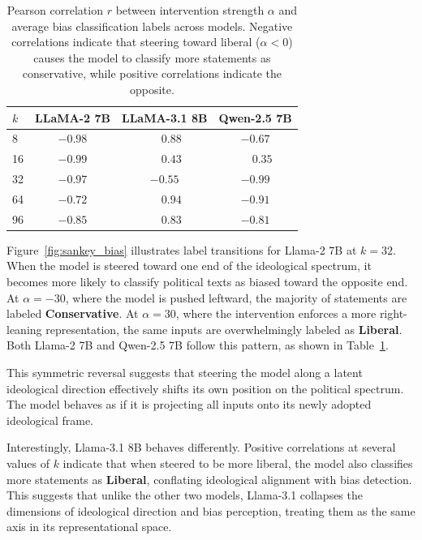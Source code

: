 \documentclass[11pt]{article}
\begin{document}
\begin{table}[t]
    \centering
    \small
    \begin{tabular}{lccc}
        \toprule
        $k$ & LLaMA-2 7B & LLaMA-3.1 8B & Qwen-2.5 7B \\
        \midrule
        8   & $-0.98$ & $\phantom{-}0.88$ & $-0.67$ \\
        16  & $\mathbf{-0.99}$ & $\phantom{-}0.43$ & $\phantom{-}0.35$ \\
        32  & $-0.97$ & $-0.55$ & $\mathbf{-0.99}$ \\
        64  & $-0.72$ & $\mathbf{\phantom{-}0.94}$ & $-0.91$ \\
        96  & $-0.85$ & $\phantom{-}0.83$ & $-0.81$ \\
        \bottomrule
    \end{tabular}
    \caption{Pearson correlation $r$ between intervention strength $\alpha$ and average bias classification labels across models. Negative correlations indicate that steering toward liberal ($\alpha<0$) causes the model to classify more statements as conservative, while positive correlations indicate the opposite.}
    \label{tab:pearson_bias}
\end{table}

Figure~\ref{fig:sankey_bias} illustrates label transitions for Llama-2 7B at $k=32$. When the model is steered toward one end of the ideological spectrum, it becomes more likely to classify political texts as biased toward the opposite end. At $\alpha = -30$, where the model is pushed leftward, the majority of statements are labeled \textbf{Conservative}. At $\alpha = 30$, where the intervention enforces a more right-leaning representation, the same inputs are overwhelmingly labeled as \textbf{Liberal}. Both Llama-2 7B and Qwen-2.5 7B follow this pattern, as shown in Table~\ref{tab:pearson_bias}.

This symmetric reversal suggests that steering the model along a latent ideological direction effectively shifts its own position on the political spectrum. The model behaves as if it is projecting all inputs onto its newly adopted ideological frame.

Interestingly, Llama-3.1 8B behaves differently. Positive correlations at several values of $k$ indicate that when steered to be more liberal, the model also classifies more statements as \textbf{Liberal}, conflating ideological alignment with bias detection. This suggests that unlike the other two models, Llama-3.1 collapses the dimensions of ideological direction and bias perception, treating them as the same axis in its representational space.
\end{document}
